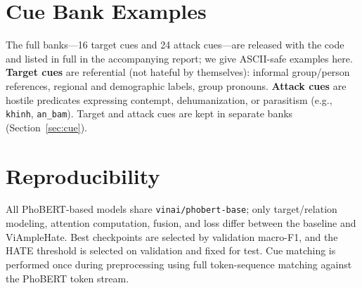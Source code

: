 \documentclass[11pt]{article}
\begin{document}
\section{Cue Bank Examples}
\label{sec:cuebank}
The full banks---16 target cues and 24 attack cues---are released with the code and listed in full in the accompanying report; we give ASCII-safe examples here. \textbf{Target cues} are referential (not hateful by themselves): informal group/person references, regional and demographic labels, group pronouns. \textbf{Attack cues} are hostile predicates expressing contempt, dehumanization, or parasitism (e.g., \texttt{khinh}, \texttt{an\_bam}). Target and attack cues are kept in separate banks (Section~\ref{sec:cue}).

\section{Reproducibility}
\label{sec:repro}
All PhoBERT-based models share \texttt{vinai/phobert-base}; only target/relation modeling, attention computation, fusion, and loss differ between the baseline and ViAmpleHate. Best checkpoints are selected by validation macro-F1, and the HATE threshold is selected on validation and fixed for test. Cue matching is performed once during preprocessing using full token-sequence matching against the PhoBERT token stream.
\end{document}
